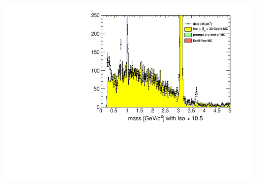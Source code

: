 \documentclass[compress]{beamer}
\begin{document}
\begin{frame}
\begin{columns}
\includegraphics[width=\linewidth]{lowdimuon_mass_noniso.pdf}
\end{columns}
\end{frame}
\end{document}
